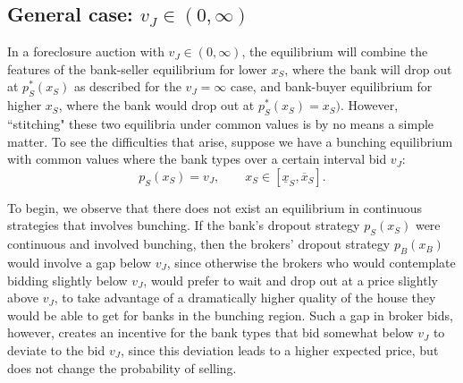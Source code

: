 \documentclass[11pt,twopage]{article}
\begin{document}

\subsection{General case: $v_J \in (0,\infty)$}

In a foreclosure auction with $v_J\in (0,\infty)$, the equilibrium
will combine the features of the bank-seller equilibrium for lower
$x_S$, where the bank will drop out at $p_S^*(x_S)$ as described for
the $v_J=\infty$ case, and bank-buyer equilibrium for higher $x_S$,
where the bank would drop out at $p_S^*(x_S) = x_S)$. However,
``stitching" these two equilibria under common values is by no means a
simple matter. To see the difficulties that arise, suppose we have a
bunching equilibrium with common values where the bank types over a
certain interval bid $v_J$:
\[ p_S(x_S) = v_J, \quad\quad x_S \in [\underline x_S,\overline x_S]
.\]

To begin, we observe that there does not exist an equilibrium in
continuous strategies that involves bunching.
If the bank's dropout strategy $p_S(x_S)$ were continuous and involved
bunching, then the brokers' dropout strategy $p_B(x_B)$ would involve
a gap below $v_J$, since otherwise the brokers who would contemplate
bidding slightly below $v_J$, would prefer to wait and drop out at a
price slightly above $v_J$, to take advantage of a dramatically higher
quality of the house they would be able to get for banks in the
bunching region. Such a gap in broker bids, however, creates an
incentive for the bank types that bid somewhat below $v_J$ to deviate
to the bid $v_J$, since this deviation leads to a higher expected
price, but does not change the probability of selling.
\end{document}
